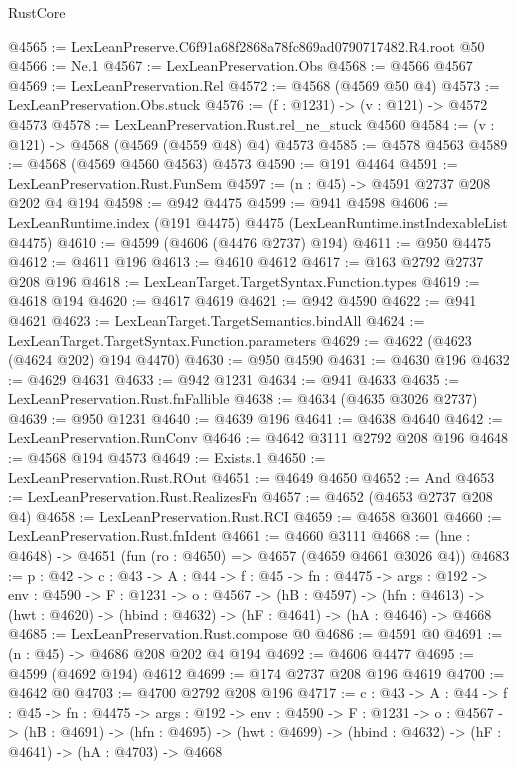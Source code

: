 \begin{lexlean}{RustCore}
\begin{coremodule}
@4565 := LexLeanPreserve.C6f91a68f2868a78fc869ad0790717482.R4.root @50
@4566 := Ne.{1}
@4567 := LexLeanPreservation.Obs
@4568 := @4566 @4567
@4569 := LexLeanPreservation.Rel
@4572 := @4568 (@4569 @50 @4)
@4573 := LexLeanPreservation.Obs.stuck
@4576 := (f : @1231) -> (v : @121) -> @4572 @4573
@4578 := LexLeanPreservation.Rust.rel_ne_stuck @4560
@4584 := (v : @121) -> @4568 (@4569 (@4559 @48) @4) @4573
@4585 := @4578 @4563
@4589 := @4568 (@4569 @4560 @4563) @4573
@4590 := @191 @4464
@4591 := LexLeanPreservation.Rust.FunSem
@4597 := (n : @45) -> @4591 @2737 @208 @202 @4 @194
@4598 := @942 @4475
@4599 := @941 @4598
@4606 := LexLeanRuntime.index (@191 @4475) @4475 (LexLeanRuntime.instIndexableList @4475)
@4610 := @4599 (@4606 (@4476 @2737) @194)
@4611 := @950 @4475
@4612 := @4611 @196
@4613 := @4610 @4612
@4617 := @163 @2792 @2737 @208 @196
@4618 := LexLeanTarget.TargetSyntax.Function.types
@4619 := @4618 @194
@4620 := @4617 @4619
@4621 := @942 @4590
@4622 := @941 @4621
@4623 := LexLeanTarget.TargetSemantics.bindAll
@4624 := LexLeanTarget.TargetSyntax.Function.parameters
@4629 := @4622 (@4623 (@4624 @202) @194 @4470)
@4630 := @950 @4590
@4631 := @4630 @196
@4632 := @4629 @4631
@4633 := @942 @1231
@4634 := @941 @4633
@4635 := LexLeanPreservation.Rust.fnFallible
@4638 := @4634 (@4635 @3026 @2737)
@4639 := @950 @1231
@4640 := @4639 @196
@4641 := @4638 @4640
@4642 := LexLeanPreservation.RunConv
@4646 := @4642 @3111 @2792 @208 @196
@4648 := @4568 @194 @4573
@4649 := Exists.{1}
@4650 := LexLeanPreservation.Rust.ROut
@4651 := @4649 @4650
@4652 := And
@4653 := LexLeanPreservation.Rust.RealizesFn
@4657 := @4652 (@4653 @2737 @208 @4)
@4658 := LexLeanPreservation.Rust.RCI
@4659 := @4658 @3601
@4660 := LexLeanPreservation.Rust.fnIdent
@4661 := @4660 @3111
@4668 := (hne : @4648) -> @4651 (fun (ro : @4650) => @4657 (@4659 @4661 @3026 @4))
@4683 := {p : @42} ->
  {c : @43} ->
  {A : @44} ->
  {f : @45} ->
  {fn : @4475} ->
  {args : @192} ->
  {env : @4590} ->
  {F : @1231} ->
  {o : @4567} ->
  (hB : @4597) ->
  (hfn : @4613) -> (hwt : @4620) -> (hbind : @4632) -> (hF : @4641) -> (hA : @4646) -> @4668
@4685 := LexLeanPreservation.Rust.compose @0
@4686 := @4591 @0
@4691 := (n : @45) -> @4686 @208 @202 @4 @194
@4692 := @4606 @4477
@4695 := @4599 (@4692 @194) @4612
@4699 := @174 @2737 @208 @196 @4619
@4700 := @4642 @0
@4703 := @4700 @2792 @208 @196
@4717 := {c : @43} ->
  {A : @44} ->
  {f : @45} ->
  {fn : @4475} ->
  {args : @192} ->
  {env : @4590} ->
  {F : @1231} ->
  {o : @4567} ->
  (hB : @4691) ->
  (hfn : @4695) -> (hwt : @4699) -> (hbind : @4632) -> (hF : @4641) -> (hA : @4703) -> @4668

\end{coremodule}
\end{lexlean}
